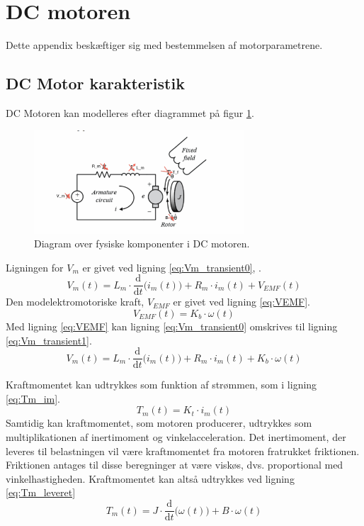 \section{DC motoren}
Dette appendix beskæftiger sig med bestemmelsen af motorparametrene.
\subsection{DC Motor karakteristik}
DC Motoren kan modelleres efter diagrammet på figur \ref{fig:DCmotor}. 

\begin{figure}[!th]
\centering
\includegraphics[width=0.7\textwidth]{./graphics/Mangleratblivetegnet}
%
\caption[DC motor]{Diagram over fysiske komponenter i DC motoren.}
\label{fig:DCmotor}
\end{figure}
Ligningen for \(V_m\) er givet ved ligning \ref{eq:Vm_transient0}, \citep{DCmotormodel}.
\begin{equation}
	V_m(t)=L_m \cdot \frac{\mathrm d}{\mathrm d t} \big( i_m(t) \big)+R_m \cdot i_m(t) + V_{EMF}(t)
	\label{eq:Vm_transient0} 
 \end{equation}
Den modelektromotoriske kraft, \(V_{EMF}\) er givet ved ligning \ref{eq:VEMF}.
\begin{equation}
	V_{EMF}(t) = K_b \cdot \omega(t)
	\label{eq:VEMF}
\end{equation}
Med ligning \ref{eq:VEMF} kan ligning \ref{eq:Vm_transient0} omskrives til ligning \ref{eq:Vm_transient1}.
\begin{equation}
	V_m(t)=L_m \cdot \frac{\mathrm d}{\mathrm d t} \big( i_m(t) \big)+R_m \cdot i_m(t) +K_b \cdot \omega(t)
	\label{eq:Vm_transient1} 
 \end{equation}

Kraftmomentet kan udtrykkes som funktion af strømmen, som i ligning \ref{eq:Tm_im}.
\begin{equation}
	T_m(t)=K_t\cdot{i_m(t)}
	\label{eq:Tm_im} 
 \end{equation}
Samtidig kan kraftmomentet, som motoren producerer, udtrykkes som multiplikationen af inertimoment og vinkelacceleration.
Det inertimoment, der leveres til belastningen vil være kraftmomentet fra motoren fratrukket friktionen.
Friktionen antages til disse beregninger at være viskøs, dvs. proportional med vinkelhastigheden.
Kraftmomentet kan altså udtrykkes ved ligning \ref{eq:Tm_leveret}
\begin{equation}
	T_m(t)=J\cdot\frac{\mathrm d}{\mathrm d t} \big(\omega(t) \big)+B\cdot\omega(t)
	\label{eq:Tm_leveret} 
 \end{equation}

